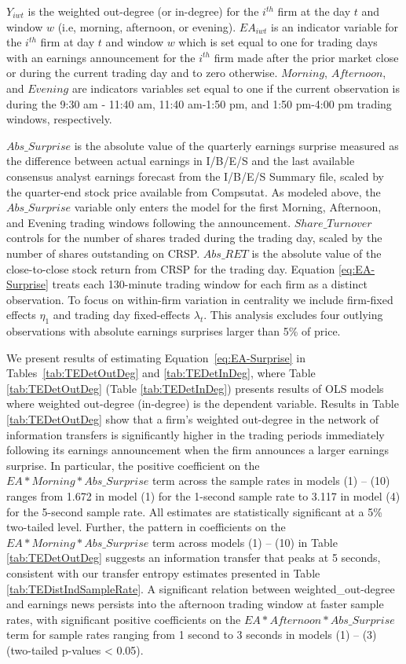 \noindent \(Y_{iwt}\) is the weighted out-degree (or in-degree) for the \(i^{th}\) firm at the day \(t\) and window \(w\) (i.e, morning, afternoon, or evening).    \(EA_{iwt}\) is an indicator variable for the \(i^{th}\) firm at day \(t\) and window \(w\)  which is set equal to one for trading days with an earnings announcement for the \(i^{th}\) firm made after the prior market close or during the current trading day and to zero otherwise.   \(Morning\),  \(Afternoon\),  and \(Evening\) are indicators variables set equal to one if the current observation is during the 9:30 am - 11:40 am, 11:40 am-1:50 pm,  and 1:50 pm-4:00 pm trading windows, respectively.   

\(Abs\_Surprise\) is the absolute value of the quarterly earnings surprise measured as the difference between actual earnings in I/B/E/S and the last available consensus analyst earnings forecast from the I/B/E/S Summary file,  scaled by the quarter-end stock price available from Compsutat.  As modeled above,  the \(Abs\_Surprise\) variable only enters the model for the first Morning, Afternoon, and Evening trading windows following the announcement.   \(Share\_Turnover\) controls for the number of shares traded during the trading day, scaled by the number of shares outstanding on CRSP.  \(Abs\_RET\) is the absolute value of the close-to-close stock return from CRSP for the trading day.  Equation \ref{eq:EA-Surprise} treats each 130-minute trading window for each firm as a distinct observation.   To focus on within-firm variation in centrality we include firm-fixed effects \(\eta_1\) and trading day fixed-effects \(\lambda_t\). This analysis excludes four outlying observations with absolute earnings surprises larger than 5\% of price. 

We present results of estimating Equation~\ref{eq:EA-Surprise} in Tables~\ref{tab:TEDetOutDeg} and \ref{tab:TEDetInDeg},  where Table \ref{tab:TEDetOutDeg} (Table \ref{tab:TEDetInDeg}) presents results of OLS models where weighted out-degree (in-degree) is the dependent variable.   Results in Table \ref{tab:TEDetOutDeg} show that a firm’s weighted out-degree in the network of information transfers is significantly higher in the trading periods immediately following its earnings announcement when the firm announces a larger earnings surprise. In particular, the positive coefficient on the \(EA*Morning*Abs\_Surprise\) term across the sample rates in models (1) – (10) ranges from 1.672 in model (1) for the 1-second sample rate to 3.117 in model (4) for the 5-second sample rate.  All estimates are statistically significant at a 5\% two-tailed level.  Further, the pattern in coefficients on the \(EA*Morning*Abs\_Surprise\) term across models (1) – (10) in Table \ref{tab:TEDetOutDeg} suggests an information transfer that peaks at 5 seconds, consistent with our transfer entropy estimates presented in Table \ref{tab:TEDistIndSampleRate}.  A significant relation between weighted\_out-degree and earnings news persists into the afternoon trading window at faster sample rates, with significant positive coefficients on the \(EA*Afternoon*Abs\_Surprise\) term for sample rates ranging from 1 second to 3 seconds in models (1) – (3) (two-tailed p-values < 0.05). 

